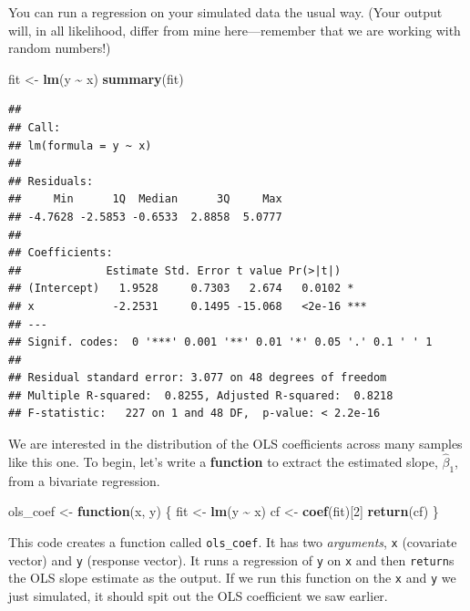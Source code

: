 \documentclass[
  12pt,
  oneside,openany]{book}
\newenvironment{Shaded}{\begin{snugshade}}{\end{snugshade}}
\newcommand{\ControlFlowTok}[1]{\textcolor[rgb]{0.13,0.29,0.53}{\textbf{#1}}}
\newcommand{\DecValTok}[1]{\textcolor[rgb]{0.00,0.00,0.81}{#1}}
\newcommand{\KeywordTok}[1]{\textcolor[rgb]{0.13,0.29,0.53}{\textbf{#1}}}
\newcommand{\NormalTok}[1]{#1}
\newcommand{\OperatorTok}[1]{\textcolor[rgb]{0.81,0.36,0.00}{\textbf{#1}}}
\newcommand{\StringTok}[1]{\textcolor[rgb]{0.31,0.60,0.02}{#1}}
\begin{document}
You can run a regression on your simulated data the usual way.
(Your output will, in all likelihood, differ from mine here---remember that we are working with random numbers!)

\begin{Shaded}
\begin{Highlighting}[]
\NormalTok{fit <{-}}\StringTok{ }\KeywordTok{lm}\NormalTok{(y }\OperatorTok{\textasciitilde{}}\StringTok{ }\NormalTok{x)}
\KeywordTok{summary}\NormalTok{(fit)}
\end{Highlighting}
\end{Shaded}

\begin{verbatim}
## 
## Call:
## lm(formula = y ~ x)
## 
## Residuals:
##     Min      1Q  Median      3Q     Max 
## -4.7628 -2.5853 -0.6533  2.8858  5.0777 
## 
## Coefficients:
##             Estimate Std. Error t value Pr(>|t|)    
## (Intercept)   1.9528     0.7303   2.674   0.0102 *  
## x            -2.2531     0.1495 -15.068   <2e-16 ***
## ---
## Signif. codes:  0 '***' 0.001 '**' 0.01 '*' 0.05 '.' 0.1 ' ' 1
## 
## Residual standard error: 3.077 on 48 degrees of freedom
## Multiple R-squared:  0.8255, Adjusted R-squared:  0.8218 
## F-statistic:   227 on 1 and 48 DF,  p-value: < 2.2e-16
\end{verbatim}

We are interested in the distribution of the OLS coefficients across many samples like this one.
To begin, let's write a \textbf{function} to extract the estimated slope, \(\hat{\beta}_1\), from a bivariate regression.

\begin{Shaded}
\begin{Highlighting}[]
\NormalTok{ols\_coef <{-}}\StringTok{ }\ControlFlowTok{function}\NormalTok{(x, y) \{}
\NormalTok{  fit <{-}}\StringTok{ }\KeywordTok{lm}\NormalTok{(y }\OperatorTok{\textasciitilde{}}\StringTok{ }\NormalTok{x)}
\NormalTok{  cf <{-}}\StringTok{ }\KeywordTok{coef}\NormalTok{(fit)[}\DecValTok{2}\NormalTok{]}
  \KeywordTok{return}\NormalTok{(cf)}
\NormalTok{\}}
\end{Highlighting}
\end{Shaded}

This code creates a function called \texttt{ols\_coef}.
It has two \emph{arguments}, \texttt{x} (covariate vector) and \texttt{y} (response vector).
It runs a regression of \texttt{y} on \texttt{x} and then \texttt{return}s the OLS slope estimate as the output.
If we run this function on the \texttt{x} and \texttt{y} we just simulated, it should spit out the OLS coefficient we saw earlier.
\end{document}

